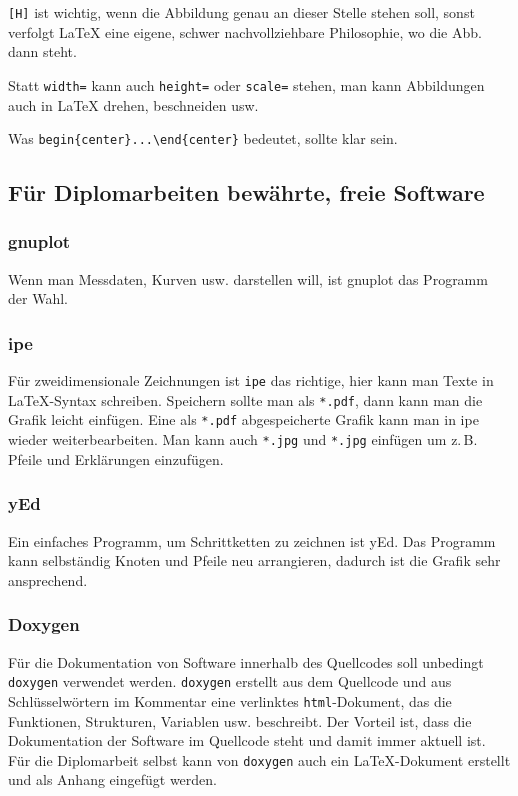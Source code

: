 		\verb"[H]" ist wichtig, wenn die Abbildung genau an dieser Stelle stehen soll, sonst verfolgt \LaTeX{} eine eigene, schwer nachvollziehbare Philosophie, wo die Abb. dann steht.
		
		Statt \verb"width=" kann auch \verb"height=" oder \verb"scale=" stehen, man kann Abbildungen auch in \LaTeX{} drehen, beschneiden usw. 
		
		Was \verb"begin{center}...\end{center}" bedeutet, sollte klar sein.
   
    \pagebreak
   	\subsection{Für Diplomarbeiten bewährte, freie Software}
   		\subsubsection{gnuplot}
   			Wenn man Messdaten, Kurven usw. darstellen will, ist gnuplot das Programm der Wahl. 
   		
   		\subsubsection{ipe}
	   		Für zweidimensionale Zeichnungen ist \verb"ipe" das richtige, hier kann man Texte in \LaTeX-Syntax schreiben. Speichern sollte man als \verb"*.pdf", dann kann man die Grafik leicht einfügen.  Eine als \verb"*.pdf" abgespeicherte Grafik kann man in ipe wieder weiterbearbeiten. Man kann auch \verb"*.jpg" und \verb"*.jpg" einfügen um z.\,B. Pfeile und Erklärungen einzufügen.
	   		
   		\subsubsection{yEd}
	   		Ein einfaches Programm, um Schrittketten zu zeichnen ist yEd. Das Programm kann selbständig Knoten und Pfeile neu arrangieren, dadurch ist die Grafik sehr ansprechend.
   		
   		\subsubsection{Doxygen}
	   		Für die Dokumentation von Software innerhalb des Quellcodes soll unbedingt \verb"doxygen" verwendet werden. \verb"doxygen" erstellt  aus dem Quellcode und aus Schlüsselwörtern im Kommentar eine verlinktes \verb"html"-Dokument, das die Funktionen, Strukturen, Variablen usw. beschreibt. Der Vorteil ist, dass die Dokumentation der Software im Quellcode steht und damit immer aktuell ist. Für die Diplomarbeit selbst kann von \verb"doxygen" auch ein \LaTeX-Dokument erstellt und als Anhang eingefügt werden.


